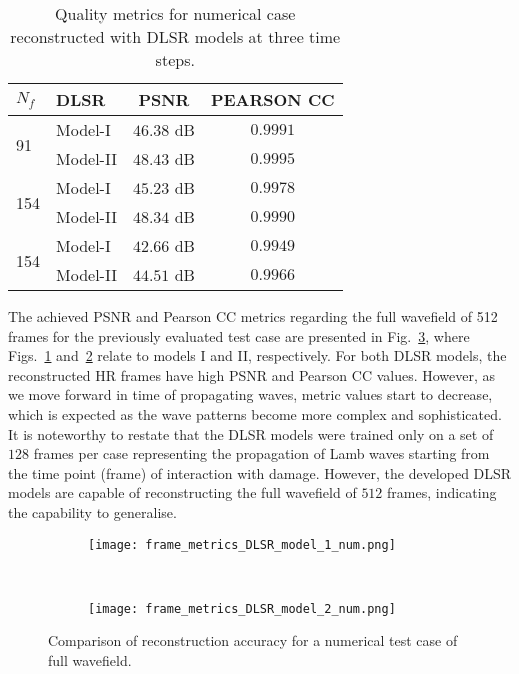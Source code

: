\begin{table}[!ht]
	\renewcommand{\arraystretch}{1.3}
	\centering \footnotesize
	\caption{Quality metrics for numerical case reconstructed with DLSR models at three time steps.}	
	\begin{tabular}{llcc} 
		\toprule		
		$N_f$ & DLSR & PSNR & PEARSON CC\\
		\midrule
		\multirow{2}{*}{91} & Model-I  & \(46.38\) dB & \(0.9991\) \\
		 				   & Model-II & \(48.43\) dB & \(0.9995\) \\
		\midrule
		\multirow{2}{*}{154} & Model-I  & \(45.23\) dB & \(0.9978\) \\
							& Model-II & \(48.34\) dB & \(0.9990\) \\
		\midrule
		\multirow{2}{*}{154} & Model-I  & \(42.66\) dB & \(0.9949\) \\
							& Model-II & \(44.51\) dB & \(0.9966\) \\
		\bottomrule
	\end{tabular}	
	\label{tab:num_results}
\end{table}

The achieved PSNR and Pearson CC metrics regarding the full wavefield of 512 frames for the previously evaluated test case are presented in Fig.~\ref{fig:num_case_475_metrics}, where Figs.~\ref{fig:num_model_I} and~\ref{fig:num_model_II} relate to models I and II, respectively.
For both DLSR models, the reconstructed HR frames have high PSNR and Pearson CC values.
However, as we move forward in time of propagating waves, metric values start to decrease, which is expected as the wave patterns become more complex and sophisticated.
It is noteworthy to restate that the DLSR models were trained only on a set of $128$ frames per case representing the propagation of Lamb waves starting from the time point (frame) of interaction with damage. 
However, the developed DLSR models are capable of reconstructing the full wavefield of $512$ frames, indicating the capability to generalise.
\begin{figure} [!ht]
	\centering
	\begin{subfigure}[b]{1\textwidth}
		\centering
		\texttt{[image: frame\_metrics\_DLSR\_model\_1\_num.png]}
		\caption{}
		\label{fig:num_model_I}
	\end{subfigure} \\
	\begin{subfigure}[b]{1\textwidth}
		\centering
		\texttt{[image: frame\_metrics\_DLSR\_model\_2\_num.png]}
		\caption{}
		\label{fig:num_model_II}
	\end{subfigure}
	\caption{Comparison of reconstruction accuracy for a numerical test case of full wavefield.}
	\label{fig:num_case_475_metrics}
\end{figure}
\clearpage

